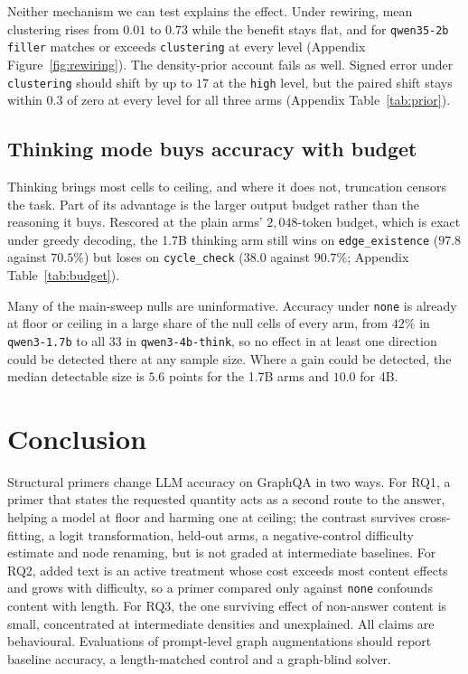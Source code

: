 \documentclass[11pt]{article}
\begin{document}
Neither mechanism we can test explains the effect. Under rewiring, mean
clustering rises from $0.01$ to $0.73$ while the benefit stays flat, and
for \texttt{qwen35-2b} \texttt{filler} matches or exceeds
\texttt{clustering} at every level (Appendix
Figure~\ref{fig:rewiring}). The density-prior account fails as well.
Signed error under \texttt{clustering} should shift by up to $17$ at the
\texttt{high} level, but the paired shift stays within $0.3$ of zero at
every level for all three arms (Appendix Table~\ref{tab:prior}).

\subsection{Thinking mode buys accuracy with budget}
\label{sec:results-thinking}
\label{sec:results-power}

Thinking brings most cells to ceiling, and where it does not, truncation
censors the task. Part of its advantage is the larger output budget rather
than the reasoning it buys. Rescored at the plain arms' $2{,}048$-token
budget, which is exact under greedy decoding, the 1.7B thinking arm still
wins on \texttt{edge\_existence} ($97.8$ against $70.5\%$) but loses on
\texttt{cycle\_check} ($38.0$ against $90.7\%$; Appendix
Table~\ref{tab:budget}).

Many of the main-sweep nulls are uninformative. Accuracy under
\texttt{none} is already at floor or ceiling in a large share of the null
cells of every arm, from $42\%$ in \texttt{qwen3-1.7b} to all $33$ in
\texttt{qwen3-4b-think}, so no effect in at least one direction could be
detected there at any sample size. Where a gain could be detected, the
median detectable size is $5.6$ points for the 1.7B arms and $10.0$ for
4B.

\section{Conclusion}
\label{sec:conclusion}

Structural primers change LLM accuracy on GraphQA in two ways. For RQ1, a
primer that states the requested quantity acts as a second route to the
answer, helping a model at floor and harming one at ceiling; the contrast
survives cross-fitting, a logit transformation, held-out arms, a
negative-control difficulty estimate and node renaming, but is not graded
at intermediate baselines. For RQ2, added text is an active treatment whose
cost exceeds most content effects and grows with difficulty, so a primer
compared only against \texttt{none} confounds content with length. For
RQ3, the one surviving effect of non-answer content is small, concentrated
at intermediate densities and unexplained. All claims are behavioural.
Evaluations of prompt-level graph augmentations should report baseline
accuracy, a length-matched control and a graph-blind solver.
\end{document}
